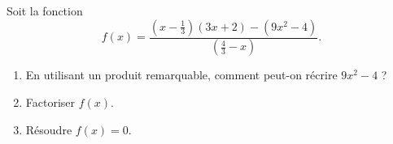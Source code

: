 
\begin{exercice}\label{exosmath-0317}

Soit la fonction
\begin{equation}
    f(x)=\frac{ (x-\frac{1}{ 3 })(3x+2)-(9x^2-4) }{ (\frac{ 4 }{ 3 }-x) }.   
\end{equation}
\begin{enumerate}
    \item
        En utilisant un produit remarquable, comment peut-on récrire \( 9x^2-4\) ?
    \item
        Factoriser \( f(x)\).
    \item
        Résoudre \( f(x)=0\).
\end{enumerate}

\end{exercice}
